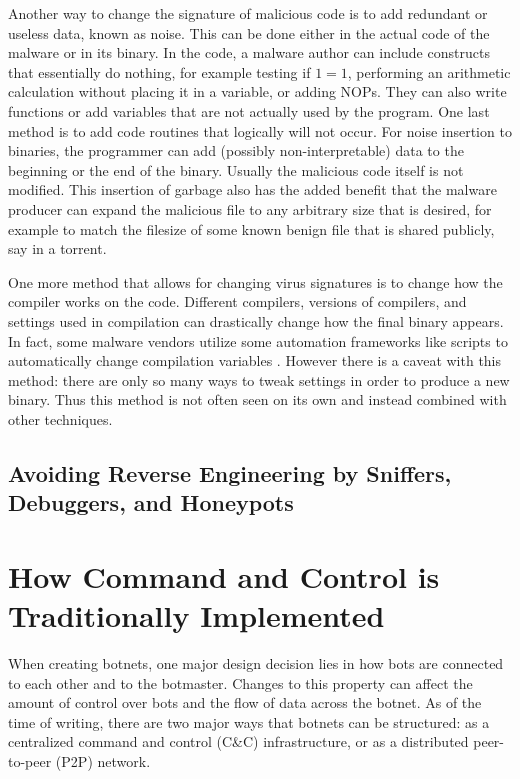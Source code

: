 \documentclass{acm_proc_article-sp}
\begin{document}
Another way to change the signature of malicious code is to add redundant or useless data, known as noise. This can be done either in the actual code of the malware or in its binary. In the code, a malware author can include constructs that essentially do nothing, for example testing if $1=1$, performing an arithmetic calculation without placing it in a variable, or adding NOPs. They can also write functions or add variables that are not actually used by the program. One last method is to add code routines that logically will not occur. For noise insertion to binaries, the programmer can add (possibly non-interpretable) data to the beginning or the end of the binary. Usually the malicious code itself is not modified. This insertion of garbage also has the added benefit that the malware producer can expand the malicious file to any arbitrary size that is desired, for example to match the filesize of some known benign file that is shared publicly, say in a torrent.

One more method that allows for changing virus signatures is to change how the compiler works on the code. Different compilers, versions of compilers, and settings used in compilation can drastically change how the final binary appears. In fact, some malware vendors utilize some automation frameworks like scripts to automatically change compilation variables \cite{ollmann:evasion}. However there is a caveat with this method: there are only so many ways to tweak settings in order to produce a new binary. Thus this method is not often seen on its own and instead combined with other techniques.



\subsection{Avoiding Reverse Engineering by Sniffers, Debuggers, and Honeypots}


\section{How Command and Control is Traditionally Implemented}


When creating botnets, one major design decision lies in how bots are connected to each other and to the botmaster. Changes to this property can affect the amount of control over bots and the flow of data across the botnet. As of the time of writing, there are two major ways that botnets can be structured: as a centralized command and control (C\&C) infrastructure, or as a distributed peer-to-peer (P2P) network.  
\end{document}
